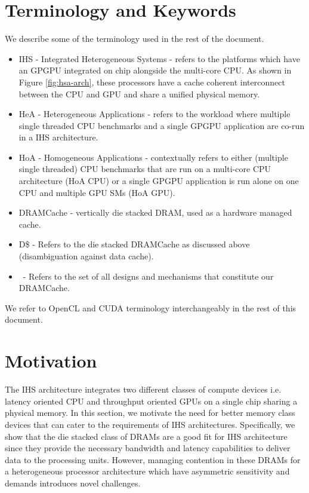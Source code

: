 \section{Terminology and Keywords}
We describe some of the terminology used in the rest of the document.
\begin{itemize}
	\item IHS - Integrated Heterogeneous Systems - refers to the platforms which have an GPGPU integrated on chip alongside the multi-core CPU. As shown in Figure \ref{fig:hsa-arch}, these processors have a cache coherent interconnect between the CPU and GPU and share a unified physical memory.
	\item HeA - Heterogeneous Applications - refers to the workload where multiple single threaded CPU benchmarks and a single GPGPU application are co-run in a IHS architecture.
	\item HoA - Homogeneous Applications - contextually refers to either (multiple single threaded) CPU benchmarks that are run on a multi-core CPU architecture (HoA CPU) or a single GPGPU application is run alone on one CPU and multiple GPU SMs (HoA GPU).
	\item DRAMCache - vertically die stacked DRAM, used as a hardware managed cache.
	\item D\$ - Refers to the die stacked DRAMCache as discussed above (disambiguation against data cache).
	\item \cachename\ - Refers to the set of all designs and mechanisms that constitute our DRAMCache.
\end{itemize}
We refer to OpenCL \cite{opencl} and CUDA \cite{cuda} terminology interchangeably in the rest of this document.

\section{Motivation} \label{motivation}
The IHS architecture integrates two different classes of compute devices i.e. latency oriented CPU and throughput oriented GPUs on a single chip sharing a physical memory. In this section, we motivate the need for better memory class devices that can cater to the requirements of IHS architectures. Specifically, we show that the die stacked class of DRAMs are a good fit for IHS architecture since they provide the necessary bandwidth and latency capabilities to deliver data to the processing units. However, managing contention in these DRAMs for a heterogeneous processor architecture which have asymmetric sensitivity and demands introduces novel challenges.

